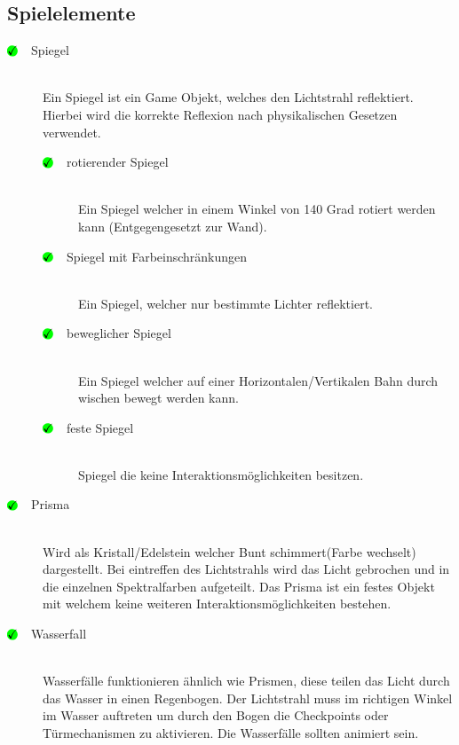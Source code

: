 \subsection{Spielelemente}
\begin{description}

\item [$\circledmark\quad$Spiegel] \hfill \\
Ein Spiegel ist ein Game Objekt, welches den Lichtstrahl reflektiert. Hierbei wird die korrekte Reflexion nach physikalischen Gesetzen verwendet. 

\begin{description}
    \item [$\circledmark\quad$rotierender Spiegel] \hfill \\
    Ein Spiegel welcher in einem Winkel von 140 Grad rotiert werden kann (Entgegengesetzt zur Wand).
    
    \item [$\circledmark\quad$Spiegel mit Farbeinschränkungen] \hfill \\
    Ein Spiegel, welcher nur bestimmte Lichter reflektiert.
    
    \item [$\circledmark\quad$beweglicher Spiegel] \hfill \\
    Ein Spiegel welcher auf einer Horizontalen/Vertikalen Bahn durch wischen bewegt werden kann.
    
    \item [$\circledmark\quad$feste Spiegel] \hfill \\
    Spiegel die keine Interaktionsmöglichkeiten besitzen.
    
\end{description}

\item [$\circledmark\quad$Prisma] \hfill \\
Wird als Kristall/Edelstein welcher Bunt schimmert(Farbe wechselt) dargestellt. Bei eintreffen des Lichtstrahls wird das Licht gebrochen und in die einzelnen Spektralfarben aufgeteilt. Das Prisma ist ein festes Objekt mit welchem keine weiteren Interaktionsmöglichkeiten bestehen.

\item [$\circledmark\quad$Wasserfall] \hfill \\
Wasserfälle funktionieren ähnlich wie Prismen, diese teilen das Licht durch das Wasser  in einen Regenbogen. Der Lichtstrahl muss im richtigen Winkel im Wasser auftreten um durch den Bogen die Checkpoints oder Türmechanismen zu aktivieren. Die Wasserfälle sollten animiert sein.


\end{description}
